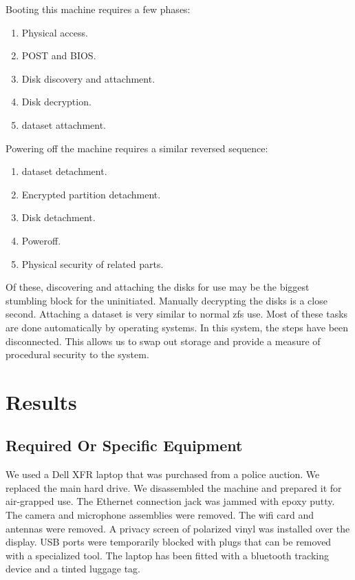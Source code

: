 Booting this machine requires a few phases:
\begin{enumerate}
\item Physical access.
\item POST and BIOS.
\item Disk discovery and attachment.
\item Disk \gls{decryption}.
\item \gls{dataset} attachment.
\end{enumerate}

Powering off the machine requires a similar reversed sequence:
\begin{enumerate}
\item \gls{dataset} detachment.
\item Encrypted \gls{partition} detachment.
\item Disk detachment.
\item Poweroff.
\item Physical security of related parts.
\end{enumerate}

Of these, discovering and attaching the disks for use may be the biggest stumbling block for the uninitiated.  Manually decrypting the disks is a close second.  Attaching a \gls{dataset} is very similar to normal \gls{zfs} use.  Most of these tasks are done automatically by operating systems.  In this system, the steps have been disconnected.  This allows us to swap out storage and provide a measure of procedural security to the system.


\section{Results}

\subsection{Required Or Specific Equipment}
We used a Dell XFR laptop that was purchased from a police auction.  We replaced the main hard drive.  We disassembled the machine and prepared it for air-grapped use.  The Ethernet connection jack was jammed with epoxy putty.  The camera and microphone assemblies were removed.  The wifi card and antennas were removed.  A privacy screen of polarized vinyl was installed over the display.  USB ports were temporarily blocked with plugs that can be removed with a specialized tool.  The laptop has been fitted with a bluetooth tracking device and a tinted luggage tag.

